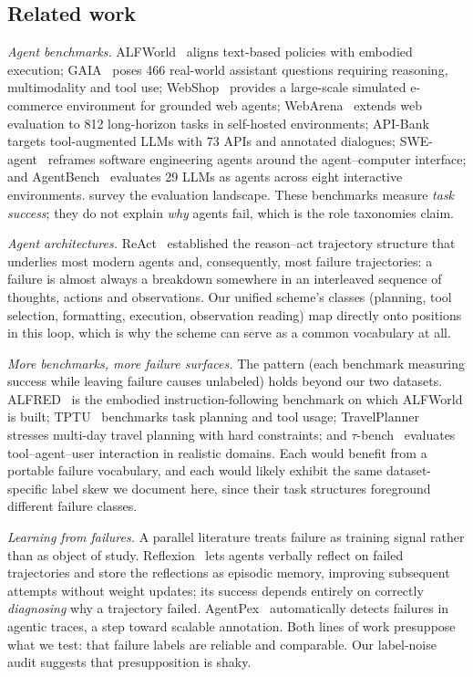 \documentclass[12pt,letterpaper]{article}
\begin{document}
\subsection{Related work}
\emph{Agent benchmarks.} ALFWorld~\cite{shridhar2021alfworld} aligns
text-based policies with embodied execution; GAIA~\cite{mialon2024gaia}
poses 466 real-world assistant questions requiring reasoning, multimodality
and tool use; WebShop~\cite{yao2022webshop} provides a large-scale simulated
e-commerce environment for grounded web agents; WebArena~\cite{zhou2024webarena}
extends web evaluation to 812 long-horizon tasks in self-hosted environments;
API-Bank~\cite{li2023apibank} targets tool-augmented LLMs with 73 APIs and
annotated dialogues; SWE-agent~\cite{yang2024sweagent} reframes software
engineering agents around the agent--computer interface; and
AgentBench~\cite{liu2023agentbench} evaluates 29 LLMs as agents across eight
interactive environments. \cite{yehudai2025survey}
survey the evaluation landscape. These benchmarks measure \emph{task
success}; they do not explain \emph{why} agents fail, which is the role
taxonomies claim.

\emph{Agent architectures.} ReAct~\cite{yao2023react} established the
reason--act trajectory structure that underlies most modern agents and,
consequently, most failure trajectories: a failure is almost always a
breakdown somewhere in an interleaved sequence of thoughts, actions and
observations. Our unified scheme's classes (planning, tool selection,
formatting, execution, observation reading) map directly onto positions in
this loop, which is why the scheme can serve as a common vocabulary at all.

\emph{More benchmarks, more failure surfaces.} The pattern (each benchmark
measuring success while leaving failure causes unlabeled) holds beyond our
two datasets. ALFRED~\cite{shridhar2020alfred} is the embodied
instruction-following benchmark on which ALFWorld is built; TPTU~\cite{ruan2023tptu}
benchmarks task planning and tool usage; TravelPlanner~\cite{xie2024travelplanner}
stresses multi-day travel planning with hard constraints; and
$\tau$-bench~\cite{yao2025taubench} evaluates tool--agent--user interaction in
realistic domains. Each would benefit from a portable failure vocabulary, and
each would likely exhibit the same dataset-specific label skew we document
here, since their task structures foreground different failure classes.

\emph{Learning from failures.} A parallel literature treats failure as
training signal rather than as object of study. Reflexion~\cite{shinn2023reflexion}
lets agents verbally reflect on failed trajectories and store the reflections
as episodic memory, improving subsequent attempts without weight updates; its
success depends entirely on correctly \emph{diagnosing} why a trajectory
failed. AgentPex~\cite{sharma2026agentpex} automatically detects failures in
agentic traces, a step toward scalable annotation. Both lines of work
presuppose what we test: that failure labels are reliable and comparable. Our
label-noise audit suggests that presupposition is shaky.
\end{document}
